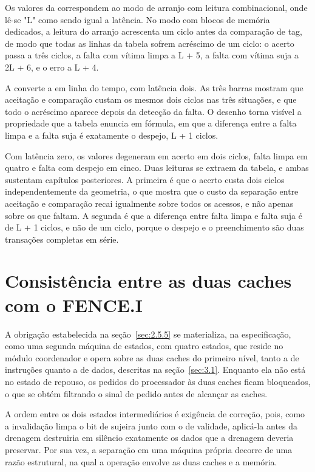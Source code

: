 Os valores da  correspondem ao modo de arranjo com leitura combinacional, onde lê-se "L" como sendo igual a latência. No modo com blocos de memória dedicados, a leitura do arranjo acrescenta um ciclo antes da comparação de tag, de modo que todas as linhas da tabela sofrem acréscimo de um ciclo: o acerto passa a três ciclos, a falta com vítima limpa a L + 5, a falta com vítima suja a 2L + 6, e o erro a L + 4.

A  converte a  em linha do tempo, com latência dois. As três barras mostram que aceitação e comparação custam os mesmos dois ciclos nas três situações, e que todo o acréscimo aparece depois da detecção da falta. O desenho torna visível a propriedade que a tabela enuncia em fórmula, em que a diferença entre a falta limpa e a falta suja é exatamente o despejo, L + 1 ciclos.


Com latência zero, os valores degeneram em acerto em dois ciclos, falta limpa em quatro e falta com despejo em cinco. Duas leituras se extraem da tabela, e ambas sustentam capítulos posteriores. A primeira é que o acerto custa dois ciclos independentemente da geometria, o que mostra que o custo da separação entre aceitação e comparação recai igualmente sobre todos os acessos, e não apenas sobre os que faltam. A segunda é que a diferença entre falta limpa e falta suja é de L + 1 ciclos, e não de um ciclo, porque o despejo e o preenchimento são duas transações completas em série.

\section{Consistência entre as duas caches com o FENCE.I}\label{sec:3.9}

A obrigação estabelecida na seção~\ref{sec:2.5.5} se materializa, na especificação, como uma segunda máquina de estados, com quatro estados, que reside no módulo coordenador e opera sobre as duas caches do primeiro nível, tanto a de instruções quanto a de dados, descritas na seção~\ref{sec:3.1}. Enquanto ela não está no estado de repouso, os pedidos do processador às duas caches ficam bloqueados, o que se obtém filtrando o sinal de pedido antes de alcançar as caches.

A ordem entre os dois estados intermediários é exigência de correção, pois, como a invalidação limpa o bit de sujeira junto com o de validade, aplicá-la antes da drenagem destruiria em silêncio exatamente os dados que a drenagem deveria preservar. Por sua vez, a separação em uma máquina própria decorre de uma razão estrutural, na qual a operação envolve as duas caches e a memória.

